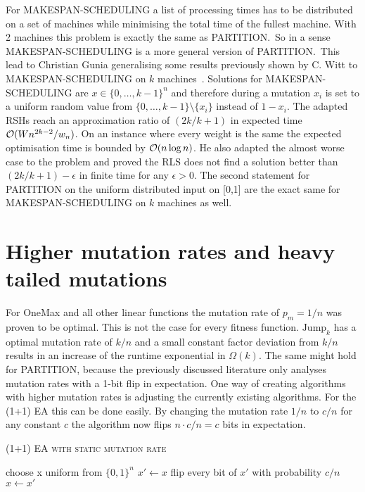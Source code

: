 For MAKESPAN-SCHEDULING a list of processing times has to be distributed on a set of machines while minimising the total time of the fullest machine.
With 2 machines this problem is exactly the same as PARTITION.\
So in a sense MAKESPAN-SCHEDULING is a more general version of PARTITION.\
This lead to Christian Gunia generalising some results previously shown by C. Witt to MAKESPAN-SCHEDULING on $k$ machines~\cite{gunia2005analysis}.
Solutions for MAKESPAN-SCHEDULING are \(x\in{\{0,\dots,k-1\}}^n\) and therefore during a mutation $x_i$ is set to a uniform random value from $\{0,\dots,k-1\}\text{\textbackslash}\{x_i\}$ instead of $1-x_i$.
The adapted RSHs reach an approximation ratio of $(2k/k+1)$ in expected time $\mathcal{O}(Wn^{2k-2}/w_n)$.
On an instance where every weight is the same the expected optimisation time is bounded by $\mathcal{O}(n\log{n})$.
He also adapted the almost worse case to the problem and proved the RLS does not find a solution better than \((2k/k+1)-\epsilon\) in finite time for any $\epsilon>0$.
The second statement for PARTITION on the uniform distributed input on [0,1] are the exact same for MAKESPAN-SCHEDULING on $k$ machines as well.

\section{Higher mutation rates and heavy tailed mutations}
For OneMax and all other linear functions the mutation rate of $p_m=1/n$ was proven to be optimal\cite{witt2013tight}.
This is not the case for every fitness function.
$\text{Jump}_k$ has a optimal mutation rate of $k/n$ and a small constant factor deviation from $k/n$ results in an increase of the runtime exponential in $\Omega(k)$\cite{doerr2017fast}.
The same might hold for PARTITION, because the previously discussed literature only analyses mutation rates with a 1-bit flip in expectation.\newline
One way of creating algorithms with higher mutation rates is adjusting the currently existing algorithms.
For the (1+1) EA this can be done easily.
By changing the mutation rate $1/n$ to $c/n$ for any constant $c$ the algorithm now flips $n\cdot c/n=c$ bits in expectation.
\begin{algorithm}[bt]
      \caption{\textsc{(1+1) EA with static mutation rate}}\label{alg:EA_SM}

      \DontPrintSemicolon %

      \BlankLine
      choose x uniform from ${\{0,1\}}^n$\;
      {
      $x' \leftarrow x$\;
      flip every bit of $x'$ with probability $c/n$\;
      {
      {
            $x \leftarrow x'$\;
      }
      }
      }
\end{algorithm}

